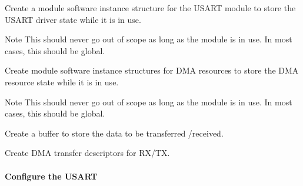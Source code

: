 \begin{DoxyEnumerate}
\item Create a module software instance structure for the U\+S\+A\+RT module to store the U\+S\+A\+RT driver state while it is in use. 
\begin{DoxyCodeInclude}{0}
\end{DoxyCodeInclude}
 \begin{DoxyNote}{Note}
This should never go out of scope as long as the module is in use. In most cases, this should be global.
\end{DoxyNote}

\item Create module software instance structures for D\+MA resources to store the D\+MA resource state while it is in use. 
\begin{DoxyCodeInclude}{0}
\end{DoxyCodeInclude}
 \begin{DoxyNote}{Note}
This should never go out of scope as long as the module is in use. In most cases, this should be global.
\end{DoxyNote}

\item Create a buffer to store the data to be transferred /received. 
\begin{DoxyCodeInclude}{0}
\end{DoxyCodeInclude}

\item Create D\+MA transfer descriptors for R\+X/\+TX. 
\begin{DoxyCodeInclude}{0}
\end{DoxyCodeInclude}
 
\end{DoxyEnumerate}\hypertarget{asfdoc_sam0_sercom_usart_dma_use_case_asfdoc_sam0_usart_dma_use_case_setup_flow_usart}{}\paragraph{Configure the U\+S\+A\+RT}\label{asfdoc_sam0_sercom_usart_dma_use_case_asfdoc_sam0_usart_dma_use_case_setup_flow_usart}


